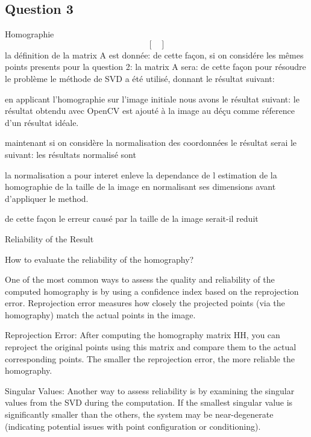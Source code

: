 \documentclass[../CSC_5RO17_TA_TP1.tex]{subfiles}
\begin{document}
\subsection*{Question 3}

Homographie
\begin{equation}
    \begin{bmatrix}

    \end{bmatrix}
\end{equation}
la définition de la matrix A est donnée:
de cette façon, si on considére les mêmes points presents pour la question 2:
la matrix A sera:
de cette façon pour résoudre le problème le méthode de SVD a été utilisé, donnant le résultat suivant:


en applicant l'homographie sur l'image initiale nous avons le résultat suivant:
le résultat obtendu avec OpenCV est ajouté à la image au déçu comme réference d'un résultat idéale.


maintenant si on considère la normalisation des coordonnées le résultat serai le suivant:
les résultats normalisé sont %

la normalisation a pour interet enleve la dependance de l estimation de la homographie de la taille de la image en normalisant ses dimensions avant d'appliquer le method.

de cette façon le erreur causé par la taille de la image serait-il reduit


Reliability of the Result

How to evaluate the reliability of the homography?

One of the most common ways to assess the quality and reliability of the computed homography is by using a confidence index based on the reprojection error. Reprojection error measures how closely the projected points (via the homography) match the actual points in the image.

    Reprojection Error: After computing the homography matrix HH, you can reproject the original points using this matrix and compare them to the actual corresponding points. The smaller the reprojection error, the more reliable the homography.

    Singular Values: Another way to assess reliability is by examining the singular values from the SVD during the computation. If the smallest singular value is significantly smaller than the others, the system may be near-degenerate (indicating potential issues with point configuration or conditioning).
\end{document}
